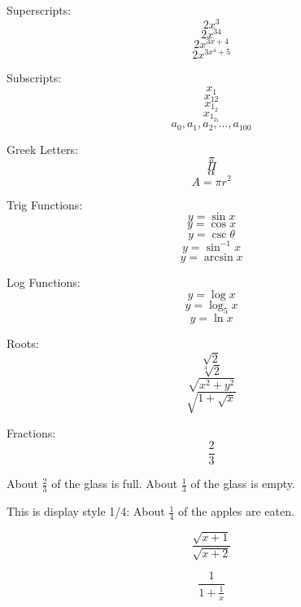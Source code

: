 \documentclass[11pt]{article}
\begin{document}
Superscripts: $$2x^3$$
$$2x^{34}$$
$$2x^{3x+4}$$
$$2x^{3x^4+5}$$

Subscripts: $$x_1$$
$$x_{12}$$
$$x_{1_2}$$
$$x_{1_{2_3}}$$
$$a_0, a_1, a_2, \ldots, a_{100}$$

Greek Letters: $$\pi$$
$$\Pi$$
$$\alpha$$
$$A=\pi r^2$$

Trig Functions: $$y=\sin x$$
$$y=\cos x$$
$$y=\csc \theta$$
$$y=\sin^{-1} x$$
$$y=\arcsin x$$

Log Functions: $$y=\log x$$
$$y=\log_5 x$$
$$y=\ln x$$

Roots: $$\sqrt{2}$$
$$\sqrt[3]{2}$$
$$\sqrt{x^2+y^2}$$
$$\sqrt{1+\sqrt{x}}$$

Fractions: $$\frac{2}{3}$$

About $\frac{2}{3}$ of the glass is full. About $\frac{1}{3}$ of the glass is empty.

This is display style 1/4: About $\displaystyle \frac{1}{4}$ of the apples are eaten.

$$\frac{\sqrt{x+1}}{\sqrt{x+2}}$$

$$\frac{1}{1+\frac{1}{x}}$$
\end{document}

